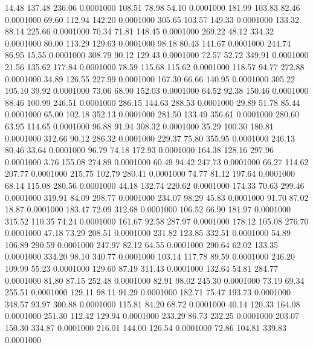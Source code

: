   14.48  137.48  236.06   0.0001000
 108.51   78.98   54.10   0.0001000
 181.99  103.83   82.46   0.0001000
  69.60  112.94  142.20   0.0001000
 305.65  103.57  149.33   0.0001000
 133.32   88.14  225.66   0.0001000
  70.34   71.81  148.45   0.0001000
 269.22   48.12  334.32   0.0001000
  80.00  113.29  129.63   0.0001000
  98.18   80.43  141.67   0.0001000
 244.74   86.95   15.55   0.0001000
 308.79   90.12  129.43   0.0001000
  72.57   52.72  349.91   0.0001000
  21.56  135.62  177.84   0.0001000
  78.59  115.68  115.62   0.0001000
 118.57   94.77  272.88   0.0001000
  34.89  126.55  227.99   0.0001000
 167.30   66.66  140.95   0.0001000
 305.22  105.10   39.92   0.0001000
  73.06   68.90  152.03   0.0001000
  64.52   92.38  150.46   0.0001000
  88.46  100.99  246.51   0.0001000
 286.15  144.63  288.53   0.0001000
  29.89   51.78   85.44   0.0001000
  65.00  102.18  352.13   0.0001000
 281.50  133.49  356.61   0.0001000
 280.60   63.95  114.65   0.0001000
  96.88   91.94  308.32   0.0001000
  35.29  100.30  180.81   0.0001000
 312.66   90.12  286.32   0.0001000
 229.37   75.80  355.95   0.0001000
 246.13   80.46   33.64   0.0001000
  96.79   74.18  172.93   0.0001000
 164.38  128.16  297.96   0.0001000
   3.76  155.08  274.89   0.0001000
  60.49   94.42  247.73   0.0001000
  66.27  114.62  207.77   0.0001000
 215.75  102.79  280.41   0.0001000
  74.77   81.12  197.64   0.0001000
  68.14  115.08  280.56   0.0001000
  44.18  132.74  220.62   0.0001000
 174.33   70.63  299.46   0.0001000
 319.91   84.09  298.77   0.0001000
 234.07   98.29   45.83   0.0001000
  91.70   87.02   18.87   0.0001000
 183.47   72.09  312.68   0.0001000
 106.52   66.90  181.97   0.0001000
 315.52  110.35   74.24   0.0001000
 161.67   92.58  287.97   0.0001000
 178.12  105.08  276.70   0.0001000
  47.18   73.29  208.51   0.0001000
 231.82  123.85  332.51   0.0001000
  54.89  106.89  290.59   0.0001000
 247.97   82.12   64.55   0.0001000
 290.64   62.02  133.35   0.0001000
 334.20   98.10  340.77   0.0001000
 103.14  117.78   89.59   0.0001000
 246.20  109.99   55.23   0.0001000
 129.60   87.19  311.43   0.0001000
 132.64   54.81  284.77   0.0001000
  81.80   87.15  252.48   0.0001000
  82.91   98.02  245.30   0.0001000
  73.19   69.34  255.51   0.0001000
 129.11   98.11   91.29   0.0001000
 182.71   75.47  193.73   0.0001000
 348.57   93.97  300.88   0.0001000
 115.81   84.20   68.72   0.0001000
  40.14  120.33  164.08   0.0001000
 251.30  112.42  129.94   0.0001000
 233.29   86.73  232.25   0.0001000
 203.07  150.30  334.87   0.0001000
 216.01  144.00  126.54   0.0001000
  72.86  104.81  339.83   0.0001000
